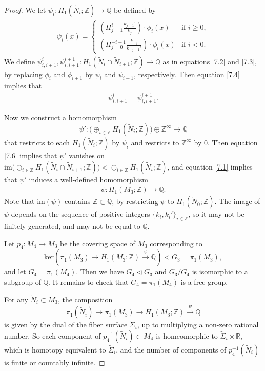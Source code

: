 \documentclass{amsart}
\numberwithin{equation}{section}
\theoremstyle{definition}
\begin{document}
\begin{proof}
We let $\psi_i:H_1(\tilde{N}_i;\mathbb{Z})\to \mathbb{\mathbb{Q}}$ be defined by 
\begin{align}\label{7.5}
\psi_i(x)=
\begin{cases}
(\Pi_{j=1}^i \frac{k_{j-1}'}{k_j})\cdot \phi_i(x) & \text{if\ } i\geq 0,\\
(\Pi_{j=0}^{-i-1} \frac{k_{-j}}{k_{-j-1}'})\cdot \phi_i(x) & \text{if\ } i<0.
\end{cases}
\end{align}
We define $\psi_{i,i+1}^i,\psi_{i,i+1}^{i+1}:H_1(\tilde{N}_i\cap \tilde{N}_{i+1};\mathbb{Z})\to \mathbb{Q}$ as in equations \eqref{7.2} and \eqref{7.3}, by replacing $\phi_i$ and $\phi_{i+1}$ by $\psi_i$ and $\psi_{i+1}$, respectively. Then equation \eqref{7.4} implies that
\begin{align}\label{7.6}
\psi_{i,i+1}^i=\psi_{i,i+1}^{i+1}.
\end{align}

Now we construct a homomorphism 
$$\psi':\Big(\oplus_{i\in \mathbb{Z}}H_1(\tilde{N}_i;\mathbb{Z})\Big)\oplus \mathbb{Z}^{\infty}\to \mathbb{Q}$$
that restricts to each $H_1(\tilde{N}_i;\mathbb{Z})$ by $\psi_i$ and restricts to $\mathbb{Z}^{\infty}$ by $0$. Then equation \eqref{7.6} implies that $\psi'$ vanishes on $\text{im}\big(\oplus_{i\in \mathbb{Z}}H_1(\tilde{N}_i\cap  \tilde{N}_{i+1};\mathbb{Z})\big)<\oplus_{i\in \mathbb{Z}}H_1(\tilde{N}_i;\mathbb{Z})$, and equation \eqref{7.1} implies that $\psi'$ induces a well-defined homomorphism
\begin{align}\label{7.7}
\psi: H_1(M_3;\mathbb{Z})\to \mathbb{Q}.
\end{align}
Note that $\text{im}(\psi)$ contains $\mathbb{Z}\subset \mathbb{Q}$, by restricting $\psi$ to $H_1(\tilde{N}_0;\mathbb{Z})$. The image of $\psi$ depends on the sequence of positive integers $\{k_i,k_i'\}_{i\in \mathbb{Z}}$, so it may not be finitely generated, and may not be equal to $\mathbb{Q}$.

Let $p_4:M_4\to M_3$ be the covering space of $M_3$ corresponding to 
$$\text{ker}(\pi_1(M_3)\to H_1(M_3;\mathbb{Z})\xrightarrow{\psi}\mathbb{Q})<G_3=\pi_1(M_3),$$
and let $G_4=\pi_1(M_4)$. Then we have $G_4\vartriangleleft G_3$ and $G_3/G_4$ is isomorphic to a subgroup of $\mathbb{Q}$. It remains to check that $G_4=\pi_1(M_4)$ is a free group.

For any $\tilde{N}_i\subset M_3$, the composition 
$$\pi_1(\tilde{N}_i)\to \pi_1(M_3)\to H_1(M_3;\mathbb{Z})\xrightarrow{\psi}\mathbb{Q}$$ is given by the dual of the fiber surface $\tilde{\Sigma}_i$, up to multiplying a non-zero rational number. So each component of $p_4^{-1}(\tilde{N}_i)\subset M_4$ is homeomorphic to $\tilde{\Sigma}_i\times \mathbb{R}$, which is homotopy equivalent to $\tilde{\Sigma}_i$, and the number of components of $p_4^{-1}(\tilde{N}_i)$ is finite or countably infinite.


\end{proof}
\end{document}
